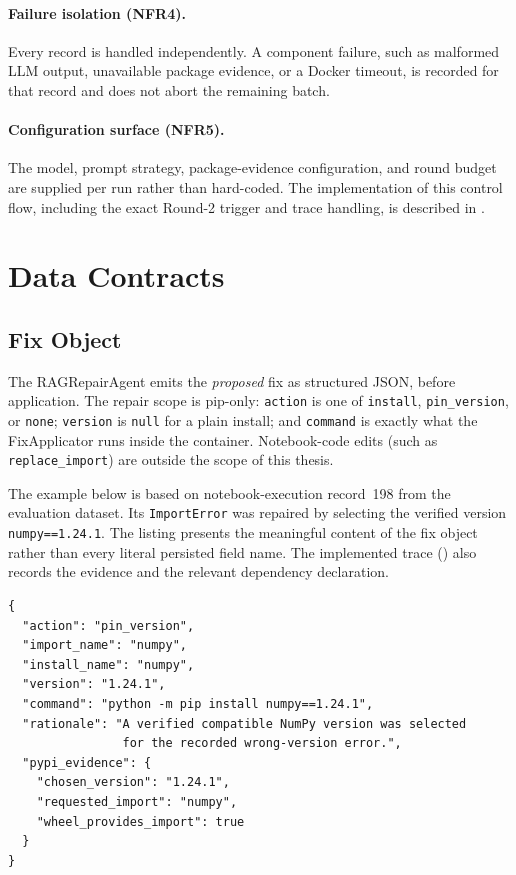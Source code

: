 \paragraph{Failure isolation (NFR4).}
Every record is handled independently. A component failure, such as malformed
LLM output, unavailable package evidence, or a Docker timeout, is recorded
for that record and does not abort the remaining batch.

\paragraph{Configuration surface (NFR5).}
The model, prompt strategy, package-evidence configuration, and round budget
are supplied per run rather than hard-coded. The implementation of this
control flow, including the exact Round-2 trigger and trace handling, is
described in .

\section{Data Contracts}
\label{sec:data-contracts}

\subsection{Fix Object}
\label{subsec:fix-object}

The RAGRepairAgent emits the \emph{proposed} fix as structured JSON,
before application. The repair scope is pip-only: \texttt{action} is one of
\texttt{install}, \texttt{pin\_version}, or \texttt{none}; \texttt{version}
is \texttt{null} for a plain install; and \texttt{command} is exactly what
the FixApplicator runs inside the container. Notebook-code edits
(such as \texttt{replace\_import}) are outside the scope of this thesis.

The example below is based on notebook-execution record~198 from the
evaluation dataset. Its \texttt{ImportError} was repaired by selecting the
verified version \texttt{numpy==1.24.1}. The listing presents the meaningful
content of the fix object rather than every literal persisted field name.
The implemented trace () also records the evidence and
the relevant dependency declaration.

\begin{verbatim}
{
  "action": "pin_version",
  "import_name": "numpy",
  "install_name": "numpy",
  "version": "1.24.1",
  "command": "python -m pip install numpy==1.24.1",
  "rationale": "A verified compatible NumPy version was selected
                for the recorded wrong-version error.",
  "pypi_evidence": {
    "chosen_version": "1.24.1",
    "requested_import": "numpy",
    "wheel_provides_import": true
  }
}
\end{verbatim}

